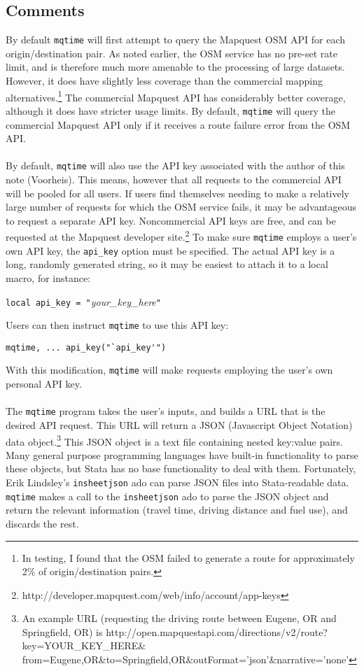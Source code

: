 \documentclass[11pt]{article}
\begin{document}
\subsection{Comments}
By default \verb|mqtime| will first attempt to query the Mapquest OSM API for each origin/destination pair. As noted earlier, the OSM service has no pre-set rate limit, and is therefore much more amenable to the processing of large datasets. However, it does have slightly less coverage than the commercial mapping alternatives.\footnote{In testing, I found that the OSM failed to generate a route for approximately 2\% of origin/destination pairs.} The commercial Mapquest API has considerably better coverage, although it does have stricter usage limits. By default, \verb|mqtime| will query the commercial Mapquest API only if it receives a route failure error from the OSM API. 
\\ \\
By default, \verb|mqtime| will also use the API key associated with the author of this note (Voorheis). This means, however  that all requests to the commercial API will be pooled for all users. If users find themselves needing to make a relatively large number of requests for which the OSM service fails, it may be advantageous to request a separate API key. Noncommercial API keys are free, and can be requested at the Mapquest developer site.\footnote{http://developer.mapquest.com/web/info/account/app-keys} To make sure \verb|mqtime| employs a user's own API key, the \verb|api_key| option must be specified. The actual API key is a long, randomly generated string, so it may be easiest to attach it to a local macro, for instance:
\begin{center}
\verb|local api_key = "|\textit{your\_key\_here}\verb|"|
\end{center}
Users can then instruct \verb|mqtime| to use this API key:
\begin{center}
\verb|mqtime, ... api_key("`api_key'")|
\end{center}
With this modification, \verb|mqtime| will make requests employing the user's own personal API key.
\\ \\
The \verb|mqtime| program takes the user's inputs, and builds a URL that is the desired API request. This URL will return a JSON (Javascript Object Notation) data object.\footnote{An example URL (requesting the driving route between Eugene, OR and Springfield, OR) is http://open.mapquestapi.com/directions/v2/route?key=YOUR\_KEY\_HERE\& from=Eugene,OR\&to=Springfield,OR\&outFormat='json'\&narrative='none'} This JSON object is a text file containing nested key:value pairs. Many general purpose programming languages have built-in functionality to parse these objects, but Stata has no base functionality to deal with them. Fortunately, Erik Lindsley's \verb|insheetjson| ado can parse JSON files into Stata-readable data. \verb|mqtime| makes a call to the \verb|insheetjson| ado to parse the JSON object and return the relevant information (travel time, driving distance and fuel use), and discards the rest.
\end{document}
